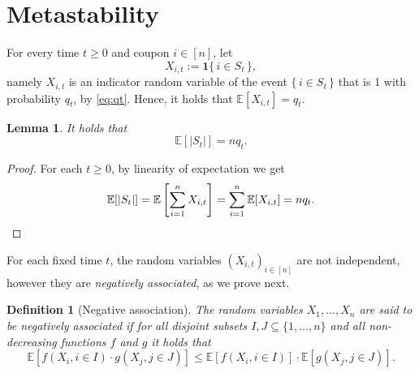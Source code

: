 \documentclass[11pt,a4paper]{article}
\newtheorem{lemma}[theorem]{Lemma}
\newtheorem{definition}[theorem]{Definition}
\newcommand{\E}{\mathbb{E}}
\begin{document}
\section{Metastability}\label{sec:metastability}
For every time $t\ge 0$ and coupon $i\in[n]$, let 
\begin{equation}\label{eq:X_it}
    X_{i,t} := \mathbf{1}\{\,i\in S_t\,\},
\end{equation}
namely $X_{i,t}$ is an indicator random variable of the event $\{\,i \in S_t\,\}$ that is 1 with probability $q_t$, by \cref{eq:qt}.
Hence, it holds that $\E[X_{i,t}] = q_t$.

\begin{lemma}\label{lemma: expectation St}
It holds that
\[
    \E[|S_t|] = n q_t.
\]
\end{lemma}
\begin{proof}
For each $t\ge 0$, by linearity of expectation we get
\begin{equation*}
    \E[|S_t|] 
    = \E\left[ \sum_{i=1}^n X_{i,t} \right]
    = \sum_{i=1}^n \E[X_{i,t}]
    = n q_t.
    \qedhere
\end{equation*}
\end{proof}

For each fixed time $t$, the random variables $(X_{i,t})_{i\in[n]}$ are not independent, however they are \textit{negatively associated}, as we prove next.

\begin{definition}[Negative association]\label{def:neg ass rvs}
The random variables $X_1,\dots,X_n$ are said to be negatively associated if for all disjoint subsets $I,J \subseteq \{1,\dots,n\}$ and all non-decreasing functions $f$ and $g$ it holds that
\[
    \E[f(X_i, i\in I) \cdot g(X_j, j\in J)] 
    \le \E[f(X_i, i\in I)] \cdot \E[g(X_j, j\in J)].
\]
\end{definition}
\end{document}
